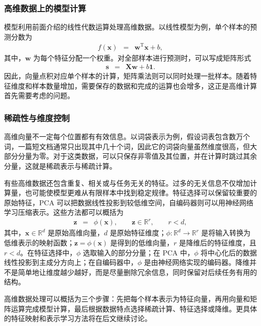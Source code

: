 \subsubsection{高维数据上的模型计算}

模型利用前面介绍的线性代数运算处理高维数据。以线性模型为例，单个样本的预测分数为
\begin{eqnarray}
f(\mathbf{x}) &=& \mathbf{w}^{\mathrm{T}}\mathbf{x}+b,
\end{eqnarray}
其中，$\mathbf{w}$ 为每个特征分配一个权重。对全部样本进行预测时，可以写成矩阵形式
\begin{eqnarray}
\mathbf{s} &=& \mathbf{X}\mathbf{w}+b\mathbf{1}.
\end{eqnarray}
因此，向量点积对应单个样本的计算，矩阵乘法则可以同时处理一批样本。随着特征维度和样本数量增加，需要保存的数据和完成的运算也会增多，这正是高维计算首先需要考虑的问题。

\subsubsection{稀疏性与维度控制}

高维向量不一定每个位置都有有效信息。以词袋表示为例，假设词表包含数万个词，一篇短文档通常只出现其中几十个词，因此它的词袋向量虽然维度很高，但大部分分量为零。对于这类数据，可以只保存非零值及其位置，并在计算时跳过其余分量，这就是稀疏表示与稀疏计算。

有些高维数据还包含重复、相关或与任务无关的特征。过多的无关信息不仅增加计算量，也可能使模型更难从有限样本中找到稳定规律。特征选择可以保留较重要的原始特征，PCA 可以把数据线性投影到较低维空间，自编码器则可以用神经网络学习压缩表示。这些方法都可以概括为
\begin{eqnarray}
\mathbf{z} &=& \phi(\mathbf{x}),
\qquad
\mathbf{z}\in\mathbb{R}^{r},\qquad r<d,
\end{eqnarray}
其中，$\mathbf{x}\in\mathbb{R}^{d}$ 是原始高维向量，$d$ 是原始特征维度；$\phi:\mathbb{R}^{d}\rightarrow\mathbb{R}^{r}$ 是将输入转换为低维表示的映射函数；$\mathbf{z}=\phi(\mathbf{x})$ 是得到的低维向量，$r$ 是降维后的特征维度，且 $r<d$。在特征选择中，$\phi$ 选取输入的部分分量；在 PCA 中，$\phi$ 将中心化后的数据线性投影到主成分方向上；在自编码器中，$\phi$ 是由神经网络实现的编码器。降维并不是简单地让维度越少越好，而是尽量删除冗余信息，同时保留对后续任务有用的结构。

\begin{importantnote}
  高维数据处理可以概括为三个步骤：先把每个样本表示为特征向量，再用向量和矩阵运算完成模型计算，最后根据数据特点选择稀疏计算、特征选择或降维。更具体的特征映射和表示学习方法将在后文继续讨论。
\end{importantnote}

